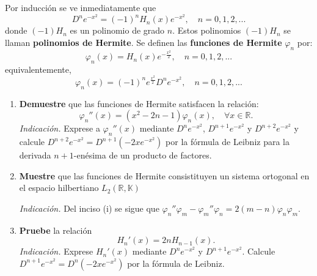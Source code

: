 \documentclass[12pt]{report}
\theoremstyle{largebreak}
\begin{document}
    \begin{excer}
        Por inducción se ve inmediatamente que
        \begin{equation*}
            D^ne^{-x^2}=(-1)^nH_n(x)e^{-x^2}, \quad n=0,1,2,...
        \end{equation*}
        donde $(-1)H_n$ es un polinomio de grado $n$. Estos polinomios $(-1)H_n$ se llaman \textbf{polinomios de Hermite}. Se definen las \textbf{funciones de Hermite} $\varphi_n$ por:
        \begin{equation*}
            \varphi_n(x)=H_n(x)e^{-\frac{x^2}{2}},\quad n=0,1,2,...
        \end{equation*}
        equivalentemente,
        \begin{equation*}
            \varphi_n(x)=(-1)^ne^{\frac{x^2}{2}}D^ne^{-x^2},\quad n=0,1,2,...
        \end{equation*}
        \begin{enumerate}
            \item \textbf{Demuestre} que las funciones de Hermite satisfacen la relación:
            \begin{equation*}
                \varphi_n''(x)=(x^2-2n-1)\varphi_n(x),\quad\forall x\in\mathbb{R}.
            \end{equation*}
            \textit{Indicación.} Exprese a $\varphi_n''(x)$ mediante $D^ne^{-x^2}$, $D^{n+1}e^{-x^2}$ y $D^{n+2}e^{-x^2}$ y calcule $D^{n+2}e^{-x^2}=D^{n+1}(-2xe^{-x^2})$ por la fórmula de Leibniz para la derivada $n+1$-enésima de un producto de factores.

            \item \textbf{Muestre} que las funciones de Hermite consistituyen un sistema ortogonal en el espacio hilbertiano $L_2(\mathbb{R},\mathbb{K})$
            
            \textit{Indicación.} Del inciso (i) se sigue que $\varphi_n''\varphi_m-\varphi_m''\varphi_n=2(m-n)\varphi_n\varphi_m$.

            \item \textbf{Pruebe} la relación
            \begin{equation*}
                H_n'(x)=2nH_{n-1}(x).
            \end{equation*}
            \textit{Indicación.} Exprese $H_n'(x)$ mediante $D^ne^{-x^2}$ y $D^{n+1}e^{-x^2}$. Calcule $D^{n+1}e^{-x^2}=D^n(-2xe^{-x^2})$ por la fórmula de Leibniz.


\end{enumerate}
\end{excer}
\end{document}
